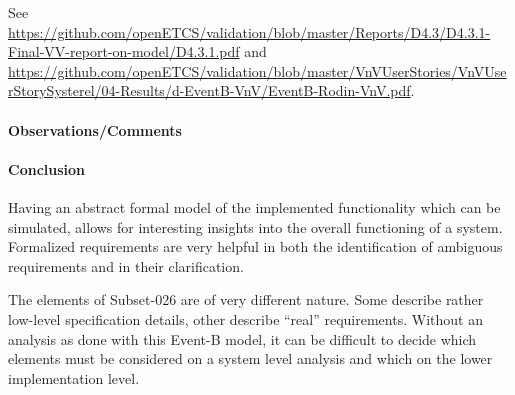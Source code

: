 See {\url{https://github.com/openETCS/validation/blob/master/Reports/D4.3/D4.3.1-Final-VV-report-on-model/D4.3.1.pdf}} and {\url{https://github.com/openETCS/validation/blob/master/VnVUserStories/VnVUserStorySysterel/04-Results/d-EventB-VnV/EventB-Rodin-VnV.pdf}}.



\paragraph{Observations/Comments}


\paragraph{Conclusion}

Having an abstract formal model of the implemented functionality which can be
simulated, allows for interesting insights into the overall functioning of a
system. Formalized requirements are very helpful in both the identification of
ambiguous requirements and in their clarification.

The elements of Subset-026 are of very different nature. Some describe rather
low-level specification details, other describe ``real'' requirements. Without
an analysis as done with this Event-B model, it can be difficult to decide which
elements must be considered on a system level analysis and which on the lower
implementation level.

